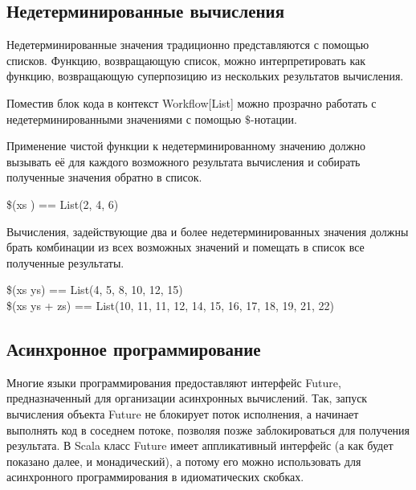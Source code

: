 \subsection{Недетерминированные вычисления}
Недетерминированные значения традиционно представляются с помощью списков. Функцию, возвращающую список, можно интерпретировать как функцию, возвращающую суперпозицию из нескольких результатов вычисления.

\begin{haskell}
\end{haskell}

Поместив блок кода в контекст \<Workflow[List]\> можно прозрачно работать с недетерминированными значениями с помощью $\$$-нотации.

Применение чистой функции к недетерминированному значению должно вызывать её для каждого возможного результата вычисления и собирать полученные значения обратно в список.

\begin{haskell}
\$(xs ) == List(2, 4, 6) \\
\end{haskell}

Вычисления, задействующие два и более недетерминированных значения должны брать комбинации из всех возможных значений и помещать в список все полученные результаты.

\begin{haskell}
\$(xs \times ys) == List(4, 5, 8, 10, 12, 15) \\
\$(xs \times ys + zs) == List(10, 11, 11, 12, 14, 15, 16, 17, 18, 19, 21, 22)
\end{haskell}

\subsection{Асинхронное программирование}\label{subsec:idioms-async}
Многие языки программирования предоставляют интерфейс \<Future\>, предназначенный для организации асинхронных вычислений. Так, запуск вычисления объекта \<Future\> не блокирует поток исполнения, а начинает выполнять код в соседнем потоке, позволяя позже заблокироваться для получения результата. В Scala класс \<Future\> имеет аппликативный интерфейс (а как будет показано далее, и монадический), а потому его можно использовать для асинхронного программирования в идиоматических скобках.

